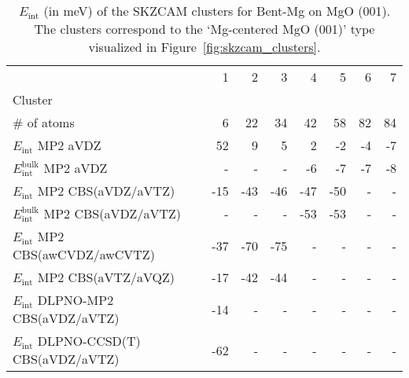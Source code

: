 \begin{table}
\caption{\label{tab:system_eint_mgo_no_bent-mg}$E_\textrm{int}$ (in meV) of the SKZCAM clusters for Bent-Mg  on MgO (001). The clusters correspond to the `Mg-centered MgO (001)' type visualized in Figure~\ref{fig:skzcam_clusters}.}
\begin{adjustbox}{center,max width=1.4\textwidth}
\begin{tabular}{lrrrrrrr}
\toprule
 & 1 & 2 & 3 & 4 & 5 & 6 & 7 \\ 
Cluster &  &  &  &  &  &  &  \\
\midrule
\# of atoms & 6 & 22 & 34 & 42 & 58 & 82 & 84 \\
$E_\textrm{int}$ MP2 aVDZ & 52 & 9 & 5 & 2 & -2 & -4 & -7 \\
$E_\textrm{int}^\textrm{bulk}$ MP2 aVDZ & - & - & - & -6 & -7 & -7 & -8 \\
$E_\textrm{int}$ MP2 CBS(aVDZ/aVTZ) & -15 & -43 & -46 & -47 & -50 & - & - \\
$E_\textrm{int}^\textrm{bulk}$ MP2 CBS(aVDZ/aVTZ) & - & - & - & -53 & -53 & - & - \\
$E_\textrm{int}$ MP2 CBS(awCVDZ/awCVTZ) & -37 & -70 & -75 & - & - & - & - \\
$E_\textrm{int}$ MP2 CBS(aVTZ/aVQZ) & -17 & -42 & -44 & - & - & - & - \\
$E_\textrm{int}$ DLPNO-MP2 CBS(aVDZ/aVTZ) & -14 & - & - & - & - & - & - \\
$E_\textrm{int}$ DLPNO-CCSD(T) CBS(aVDZ/aVTZ) & -62 & - & - & - & - & - & - \\
\bottomrule
\end{tabular}
\end{adjustbox}
\end{table}

